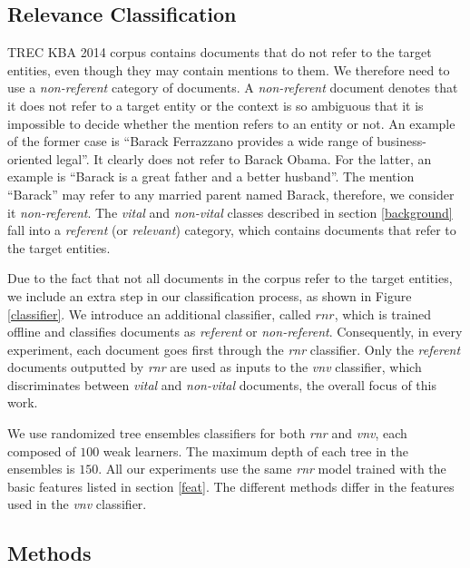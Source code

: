 \documentclass{article}
\begin{document}
\subsection{Relevance Classification}

TREC KBA 2014 corpus contains documents that do not refer to the target entities, even though they may contain mentions to them. We therefore need to use a \emph{non-referent} category of documents. 
%
A \emph{non-referent} document denotes that it does not refer to a target entity or the context is so ambiguous that it is impossible to decide whether the mention refers to an entity or not. An example of the former case is ``Barack Ferrazzano provides a wide range of business-oriented legal''. It clearly does not refer to Barack Obama. For the latter, an example is ``Barack is a great father and a better husband''. The mention ``Barack'' may refer to any married parent named Barack, therefore, we consider it \emph{non-referent}.
%
The \emph{vital} and \emph{non-vital} classes described in section \ref{background} fall into a \emph{referent} (or \emph{relevant}) category, which contains documents that refer to the target entities.

Due to the fact that not all documents in the corpus refer to the target entities, we include an extra step in our classification process, as shown in Figure \ref{classifier}. We introduce an additional classifier, called $rnr$, which is trained offline and classifies documents as \emph{referent} or \emph{non-referent}.
Consequently, in every experiment, each document goes first through the \emph{rnr} classifier. Only the \emph{referent} documents outputted by \emph{rnr} are used as inputs to the \emph{vnv} classifier, which discriminates between \emph{vital} and \emph{non-vital} documents, the overall focus of this work.

We use randomized tree ensembles classifiers \cite{GEW06a} for both \emph{rnr} and \emph{vnv}, each composed of $100$ weak learners. The maximum depth of each tree in the ensembles is $150$.
%
All our experiments use the same \emph{rnr} model trained with the basic features listed in section \ref{feat}.
The different methods differ in the features used in the \emph{vnv} classifier.

\subsection{Methods}
\label{expe}
\end{document}
